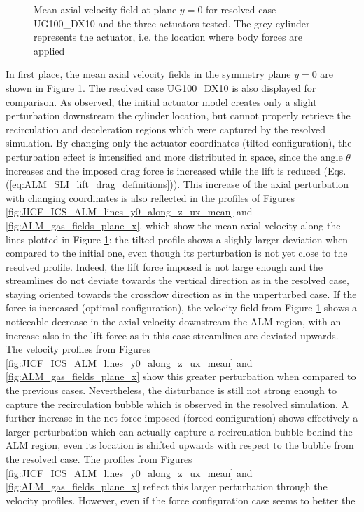\begin{figure}[h!]	
	\centering	{}
	\caption{Mean axial velocity field at plane $y = 0$ for resolved case UG100\_DX10 and the three actuators tested. The grey cylinder represents the actuator, i.e. the location where body forces are applied}
	\label{fig:ALM_gas_fields_plane_Y}
\end{figure}


In first place, the mean axial velocity fields in the symmetry plane $y = 0$ are shown in Figure \ref{fig:ALM_gas_fields_plane_Y}. The resolved case UG100\_DX10 is also displayed for comparison.  As observed, the initial actuator model creates only a slight perturbation downstream the cylinder location, but cannot properly retrieve the recirculation and deceleration regions which were captured by the resolved simulation. By changing only the actuator coordinates (tilted configuration), the perturbation effect is intensified and more distributed in space, since the angle $\theta$ increases and the imposed drag force is increased while the lift is reduced (Eqs. (\ref{eq:ALM_SLI_lift_drag_definitions})). This increase of the axial perturbation with changing coordinates is also reflected in the profiles of Figures \ref{fig:JICF_ICS_ALM_lines_y0_along_z_ux_mean} and \ref{fig:ALM_gas_fields_plane_x}, which show the mean axial velocity along the lines plotted in Figure \ref{fig:ALM_gas_fields_plane_Y}: the tilted profile shows a slighly larger deviation when compared to the initial one, even though its perturbation is not yet close to the resolved profile. Indeed, the lift force imposed is not large enough and the streamlines do not deviate towards the vertical direction as in the resolved case, staying oriented towards the crossflow direction as in the unperturbed case. If the force is increased (optimal configuration), the velocity field from Figure \ref{fig:ALM_gas_fields_plane_Y} shows a noticeable decrease in the axial velocity downstream the ALM region, with an increase also in the lift force as in this case streamlines are deviated upwards. The velocity profiles from Figures \ref{fig:JICF_ICS_ALM_lines_y0_along_z_ux_mean} and \ref{fig:ALM_gas_fields_plane_x} show this greater perturbation when compared to the previous cases. Nevertheless, the disturbance is still not strong enough to capture the recirculation bubble which is observed in the resolved simulation. A further increase in the net force imposed (forced configuration) shows effectively a larger perturbation which can actually capture a recirculation bubble behind the ALM region, even its location is shifted upwards with respect to the bubble from the resolved case. The profiles from Figures \ref{fig:JICF_ICS_ALM_lines_y0_along_z_ux_mean} and \ref{fig:ALM_gas_fields_plane_x} reflect this larger perturbation through the velocity profiles. However, even if the force configuration case seems to better the 